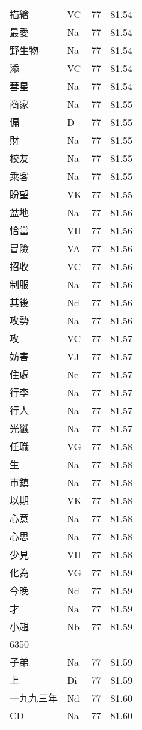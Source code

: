 \documentclass[twocolumn]{book}
\begin{document}
\begin{supertabular}{llrr}
描繪 & VC & 77 &  81.54\\
最愛 & Na & 77 &  81.54\\
野生物 & Na & 77 &  81.54\\
添 & VC & 77 &  81.54\\
彗星 & Na & 77 &  81.54\\
商家 & Na & 77 &  81.55\\
偏 & D & 77 &  81.55\\
財 & Na & 77 &  81.55\\
校友 & Na & 77 &  81.55\\
乘客 & Na & 77 &  81.55\\
盼望 & VK & 77 &  81.55\\
盆地 & Na & 77 &  81.56\\
恰當 & VH & 77 &  81.56\\
冒險 & VA & 77 &  81.56\\
招收 & VC & 77 &  81.56\\
制服 & Na & 77 &  81.56\\
其後 & Nd & 77 &  81.56\\
攻勢 & Na & 77 &  81.56\\
攻 & VC & 77 &  81.57\\
妨害 & VJ & 77 &  81.57\\
住處 & Nc & 77 &  81.57\\
行李 & Na & 77 &  81.57\\
行人 & Na & 77 &  81.57\\
光纖 & Na & 77 &  81.57\\
任職 & VG & 77 &  81.58\\
生 & Na & 77 &  81.58\\
市鎮 & Na & 77 &  81.58\\
以期 & VK & 77 &  81.58\\
心意 & Na & 77 &  81.58\\
心思 & Na & 77 &  81.58\\
少見 & VH & 77 &  81.58\\
化為 & VG & 77 &  81.59\\
今晚 & Nd & 77 &  81.59\\
才 & Na & 77 &  81.59\\
小趙 & Nb & 77 &  81.59\\
6350\\
子弟 & Na & 77 &  81.59\\
上 & Di & 77 &  81.59\\
一九九三年 & Nd & 77 &  81.60\\
CD & Na & 77 &  81.60\\

\end{supertabular}
\end{document}
